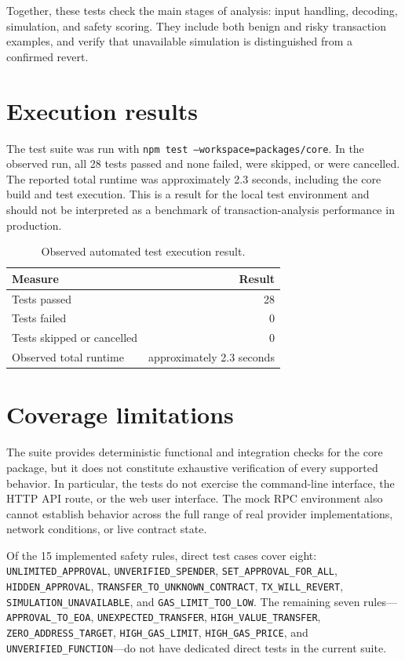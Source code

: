 \documentclass[10pt,a4paper]{article}
\begin{document}
Together, these tests check the main stages of analysis: input handling, decoding, simulation, and safety scoring. They include both benign and risky transaction examples, and verify that unavailable simulation is distinguished from a confirmed revert.

\section{Execution results}

The test suite was run with \texttt{npm test --workspace=packages/core}. In the observed run, all 28 tests passed and none failed, were skipped, or were cancelled. The reported total runtime was approximately 2.3 seconds, including the core build and test execution. This is a result for the local test environment and should not be interpreted as a benchmark of transaction-analysis performance in production.

\begin{table}[htbp]
\centering
\caption{Observed automated test execution result.}
\label{tab:test-results}
\begin{tabular}{lr}
\toprule
\textbf{Measure} & \textbf{Result} \\
\midrule
Tests passed & 28 \\
Tests failed & 0 \\
Tests skipped or cancelled & 0 \\
Observed total runtime & approximately 2.3 seconds \\
\bottomrule
\end{tabular}
\end{table}

\section{Coverage limitations}

The suite provides deterministic functional and integration checks for the core package, but it does not constitute exhaustive verification of every supported behavior. In particular, the tests do not exercise the command-line interface, the HTTP API route, or the web user interface. The mock RPC environment also cannot establish behavior across the full range of real provider implementations, network conditions, or live contract state.

Of the 15 implemented safety rules, direct test cases cover eight: \texttt{UNLIMITED\_APPROVAL}, \texttt{UNVERIFIED\_SPENDER}, \texttt{SET\_APPROVAL\_FOR\_ALL}, \texttt{HIDDEN\_APPROVAL}, \texttt{TRANSFER\_TO\_UNKNOWN\_CONTRACT}, \texttt{TX\_WILL\_REVERT}, \texttt{SIMULATION\_UNAVAILABLE}, and \texttt{GAS\_LIMIT\_TOO\_LOW}. The remaining seven rules---\texttt{APPROVAL\_TO\_EOA}, \texttt{UNEXPECTED\_TRANSFER}, \texttt{HIGH\_VALUE\_TRANSFER}, \texttt{ZERO\_ADDRESS\_TARGET}, \texttt{HIGH\_GAS\_LIMIT}, \texttt{HIGH\_GAS\_PRICE}, and \texttt{UNVERIFIED\_FUNCTION}---do not have dedicated direct tests in the current suite.
\end{document}

